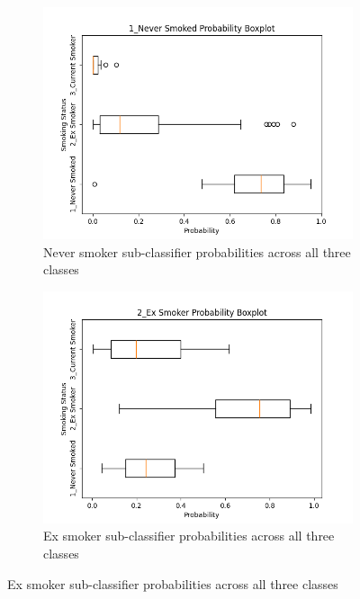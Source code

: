 \documentclass{article}
\begin{document}
\begin{figure}
    \centering
    \begin{subfigure}{0.48\textwidth}
        \centering
        \includegraphics[width=\linewidth]{cohort1_1_boxplot.png}
        \caption{Never smoker sub-classifier probabilities across all three classes}
    \end{subfigure}
    \hfill
    \begin{subfigure}{0.48\textwidth}
        \centering
        \includegraphics[width=\linewidth]{cohort1_2_boxplot.png}
        \caption{Ex smoker sub-classifier probabilities across all three classes}
    \end{subfigure}
    \par\vspace{0.5em}

\end{figure}
\end{document}
